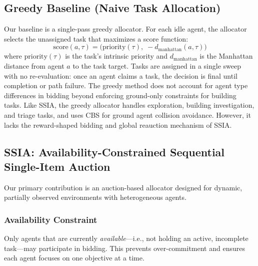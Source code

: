 \documentclass[conference]{IEEEtran}
\begin{document}
\subsection{Greedy Baseline (Naive Task Allocation)}

Our baseline is a single-pass greedy allocator. For each idle agent, the allocator selects the unassigned task that maximizes a score function:
\begin{equation}
    \text{score}(a, \tau) = \bigl(\text{priority}(\tau),\; -d_{\text{manhattan}}(a, \tau)\bigr)
    \label{eq:greedy}
\end{equation}
where $\text{priority}(\tau)$ is the task's intrinsic priority and $d_{\text{manhattan}}$ is the Manhattan distance from agent $a$ to the task target. Tasks are assigned in a single sweep with no re-evaluation: once an agent claims a task, the decision is final until completion or path failure. The greedy method does not account for agent type differences in bidding beyond enforcing ground-only constraints for building tasks. Like SSIA, the greedy allocator handles exploration, building investigation, and triage tasks, and uses CBS for ground agent collision avoidance. However, it lacks the reward-shaped bidding and global reauction mechanism of SSIA.

\subsection{SSIA: Availability-Constrained Sequential Single-Item Auction}

Our primary contribution is an auction-based allocator designed for dynamic, partially observed environments with heterogeneous agents.

\subsubsection{Availability Constraint}
Only agents that are currently \emph{available}---i.e., not holding an active, incomplete task---may participate in bidding. This prevents over-commitment and ensures each agent focuses on one objective at a time.
\end{document}
